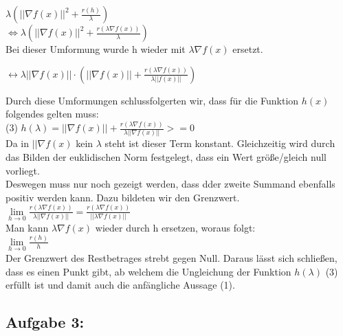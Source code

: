 $\lambda (||\nabla f(x)||^2 + \frac{r(h)}{\lambda})$ \\

$\Leftrightarrow \lambda(||\nabla f(x)||^2 + \frac{r(\lambda \nabla f(x))}{\lambda})$ \\

Bei dieser Umformung wurde h wieder mit $\lambda\nabla f(x)$ ersetzt.

$\leftrightarrow \lambda ||\nabla f(x)|| \cdot (||\nabla f(x)|| + \frac{r(\lambda \nabla f(x))}{\lambda || f(x)||})$


Durch diese Umformungen schlussfolgerten wir, dass f\"ur die Funktion $h(x)$ folgendes gelten muss:\\
(3) $h(\lambda)=||\nabla f(x)|| + \frac{r(\lambda\nabla f(x))}{\lambda||\nabla f(x)||} >=0$ \\

Da in $||\nabla f(x)$ kein $\lambda$ steht ist dieser Term konstant. Gleichzeitig wird durch das Bilden der euklidischen Norm festgelegt, dass ein Wert größe/gleich null vorliegt. \\ %
Deswegen muss nur noch gezeigt werden, dass dder zweite Summand ebenfalls positiv werden kann. Dazu bildeten wir den Grenzwert. \\ %
$\lim\limits_{h \rightarrow 0}{\frac{r(\lambda \nabla f(x))}{\lambda ||\nabla f(x)||}} = \frac{r(\lambda \nabla f(x))}{||\lambda  \nabla f(x)||}$ \\ %

Man kann $\lambda \nabla f(x)$ wieder durch h ersetzen, woraus folgt: \\
$\lim\limits_{h \rightarrow 0} \frac{r(h)}{h}$ \\

Der Grenzwert des Restbetrages strebt gegen Null. Daraus lässt sich schließen, dass es einen Punkt gibt, ab welchem die Ungleichung der Funktion $h(\lambda)$ (3) erfüllt ist und damit auch die anfängliche Aussage (1). \\ %
\vspace{15pt}

\subsection{Aufgabe 3:} 

